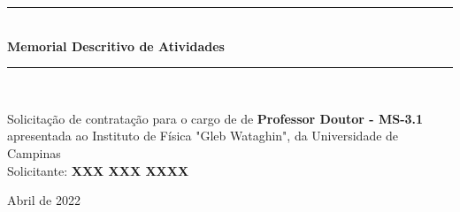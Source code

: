 \documentclass[a4paper,oneside,10pt]{article}
\begin{document}
\begin{titlepage}

\vspace{-5.0cm}

\begin{figure}[!htb]
 \label{fig:IFGW_logo}
\end{figure}

\begin{center}
\vspace{1cm}
\rule{1.0\textwidth}{1pt} \\ [0.5cm]
{\Huge \textbf{\textsf{Memorial Descritivo de Atividades}}} \\
\rule{1.0\textwidth}{1pt} \\
\vspace{2cm}

\doublespacing
{\Large \textsf{Solicita\c{c}\~{a}o de contratação para o cargo de de \textbf{Professor Doutor - MS-3.1} apresentada ao Instituto de Física "Gleb Wataghin", da Universidade de Campinas}}\\
\vspace{1.5cm}
{\LARGE \textsf{Solicitante: \textbf{XXX XXX XXXX}}}\\
\vspace{0.5cm}

\vspace{2.0cm}

\normalsize \textsf{Abril de 2022}

\end{center}
\thispagestyle{empty}
\end{titlepage}
\end{document}

